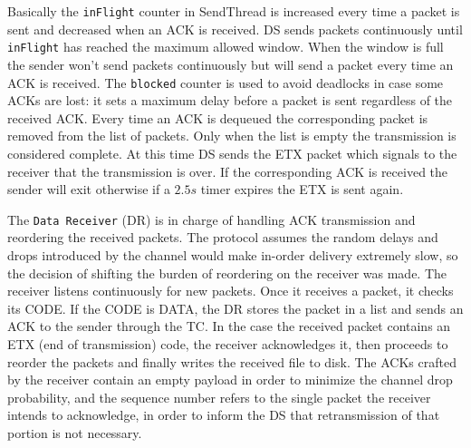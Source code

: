 \documentclass[10pt,twocolumn]{article}
\begin{document}
Basically the \texttt{inFlight} counter in SendThread is increased every time
a packet is sent and decreased when an ACK is received. DS sends packets
continuously until \texttt{inFlight} has reached the maximum allowed window.
When the window is full the sender won't send packets continuously but will
send a packet every time an ACK is received. The \texttt{blocked} counter is
used to avoid deadlocks in case some ACKs are lost: it sets a maximum delay
before a packet is sent regardless of the received ACK.
Every time an ACK is dequeued the corresponding packet is removed from the
list of packets. Only when the list is empty the transmission is considered
complete. At this time DS sends the ETX packet which signals to the receiver
that the transmission is over. If the corresponding ACK is received the sender
will exit otherwise if a $2.5s$ timer expires the ETX is sent again.

The \texttt{Data Receiver} (DR) is in charge of handling ACK transmission and reordering the received packets. The protocol assumes the random delays and drops introduced by the channel would make in-order delivery extremely slow, so the decision of shifting the burden of reordering on the receiver was made. The receiver listens continuously for new packets. Once it receives a packet, it checks its CODE. If the CODE is DATA, the DR stores the packet in a list and sends an ACK to the sender through the TC. In the case the received packet contains an ETX (end of transmission) code, the receiver acknowledges it, then proceeds to reorder the packets and finally writes the received file to disk. The ACKs crafted by the receiver contain an empty payload in order to minimize the channel drop probability, and the sequence number refers to the single packet the receiver intends to acknowledge, in order to inform the DS that retransmission of that portion is not necessary.
\end{document}
